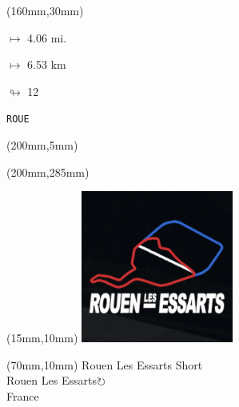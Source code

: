 \begin{textblock*}{40mm}(160mm,30mm)%
\Large
\par$\mapsto$ 4.06 mi.
\par$\mapsto$ 6.53 km
\par$\looparrowright$ 12
\par\hfill\tiny\tt ROUE\\
\end{textblock*}
\begin{textblock*}{20mm}(200mm,5mm)%
\fbox{\thepage}
\label{ROUE}
\end{textblock*}
\begin{textblock*}{20mm}(200mm,285mm)%
\fbox{\thepage}
\end{textblock*}

\null\newpage
\begin{textblock*}{50mm}(15mm,10mm)%
\includegraphics[width=50mm]{LG/ROUE.png}
\end{textblock*}
\begin{textblock*}{130mm}(70mm,10mm)%
{\fontsize{20}{20}\selectfont Rouen Les Essarts Short\\}
{\fontsize{16}{16}\selectfont Rouen Les Essarts\hfill \Large$\circlearrowright$\\}
{\fontsize{12}{12}\selectfont France\\}
\end{textblock*}
